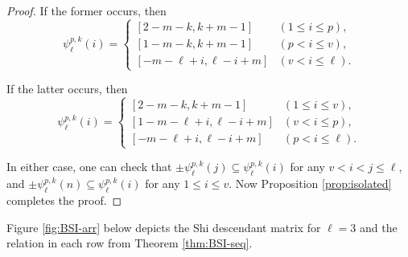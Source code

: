 \begin{proof}
If the former occurs, then 
$$
 \psi_{\ell}^{p,k}(i)  =\begin{cases}
[2 - m -k, k+m-1 ] & (1 \leq   i \leq p), \\
[ 1 - m -k, k+m-1] & (p<  i \leq  v), \\
[ - m - \ell+i , \ell-i+m ] & (v <  i \leq  \ell ).
\end{cases}
$$
 
If the latter occurs, then
$$
 \psi_{\ell}^{p,k}(i) =\begin{cases}
[2 - m -k, k+m-1] & (1 \leq   i \leq  v), \\
[ 1- m - \ell+i , \ell-i+m]  & ( v<  i \leq p), \\
[ - m - \ell+i , \ell-i+m] & (p<  i \leq  \ell ).
\end{cases}
$$

In either case, one can check that $\pm  \psi_{\ell}^{p,k}(j) \subseteq \psi_{\ell}^{p,k}(i) $ for any $v< i<j \le \ell$, and $\pm  \psi_{\ell}^{p,k}(n) \subseteq \psi_{\ell}^{p,k}(i) $ for any $ 1 \le i  \le v$. 
Now Proposition \ref{prop:isolated} completes the proof.
\end{proof}

Figure \ref{fig:BSI-arr} below depicts the Shi descendant  matrix for $\ell=3$ and the relation in each row from Theorem \ref{thm:BSI-seq}.
 

